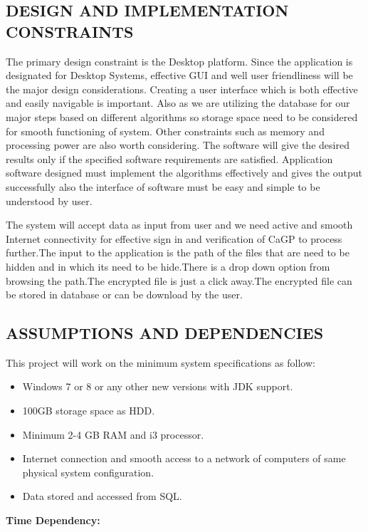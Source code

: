 \documentclass[12pt]{extreport}
\begin{document}
      \subsection{DESIGN AND IMPLEMENTATION CONSTRAINTS}
\hspace*{5em}The primary design constraint is the Desktop platform.  Since the application is designated for Desktop Systems, effective GUI and well user friendliness will be  the  major  design considerations. Creating a user interface  which is both effective and easily navigable is important. Also as we are utilizing the database for our major steps based on different algorithms so storage space need to be considered for smooth functioning of system. Other constraints such as memory and processing power are also worth considering. The software will give the desired results only if the specified software requirements are satisfied. Application software designed must implement the algorithms effectively and gives the output successfully also the interface of software must be easy and simple to be understood by user.
           \par The system will accept data as input from user and we need active and smooth Internet connectivity for effective sign in and verification of CaGP to process further.The input to the application is the path of the files that are need to be hidden and in which its need to be hide.There is a drop down option from browsing the path.The encrypted file is just a click away.The encrypted file can be stored in database or can be download by the user.
\newpage
\noindent
     \subsection{ASSUMPTIONS AND DEPENDENCIES}
     This project will work on the minimum system specifications as follow:
\begin{itemize}
\item Windows 7 or 8 or any other new versions with JDK support.
\item 100GB storage space as HDD.
\item Minimum 2-4 GB RAM and i3 processor.
\item Internet connection and smooth access to a network of computers of same physical system configuration.
\item Data stored and accessed from SQL.
\end{itemize}
\textbf{Time Dependency:}\\
\end{document}
